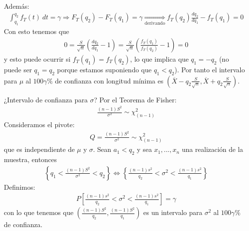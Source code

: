 \begin{ejemplo}
\begin{align*}
    \end{align*}
    Además:
    \begin{align*}
        \int_{q_1}^{q_2}{f_T(t) \ dt} = \gamma \Longrightarrow F_T(q_2) - F_T(q_1) = \gamma \underset{\text{derivando}}{\Longrightarrow} f_T(q_2)\frac{d q_2}{d q_1} - f_T(q_1) = 0
    \end{align*}
    Con esto tenemos que
    \begin{align*}
        0 = \frac{S}{\sqrt{n}}\left( \frac{d q_2}{d q_1} -1 \right) = \frac{S}{\sqrt{n}}\left( \frac{f_T(q_1)}{f_T(q_2)} -1 \right) = 0
    \end{align*}
    y esto puede ocurrir si $f_T(q_1) = f_T(q_2)$, lo que implica que $q_1 = -q_2$ (no puede ser $q_1 = q_2$ porque estamos suponiendo que $q_1 < q_2$). Por tanto el intervalo para $\mu$ al $100 \gamma \%$ de confianza con longitud mínima es $\left(\overline{X} - q_2 \frac{S}{\sqrt{n}} , \overline{X} +q_2\frac{S}{\sqrt{n}}\right)$.

    ¿Intervalo de confianza para $\sigma$? Por el Teorema de Fisher:
    \begin{align*}
        \frac{(n-1)S^2}{\sigma^2} \sim \chi^2_{(n-1)}
    \end{align*}
    Consideramos el pivote:
    \begin{align*}
        Q = \frac{(n-1)S^2}{\sigma^2} \sim \chi^2_{(n-1)}
    \end{align*}
    que es independiente de $\mu$ y $\sigma$. Sean $a_1 < q_2$ y sea $x_1,...,x_n$ una realización de la muestra, entonces
    \begin{align*}
        \left\{ q_1 < \frac{(n-1)S^2}{\sigma^2} < q_2\right\} \Longleftrightarrow \left\{ \frac{(n-1)s^2}{q_2} < \sigma^2 < \frac{(n-1)s^2}{q_1} \right\}
    \end{align*}
    Definimos:
    \begin{align*}
        P\left[ \frac{(n-1)s^2}{q_2} < \sigma^2 < \frac{(n-1)s^2}{q_1} \right] = \gamma
    \end{align*}
    con lo que tenemos que $\left(\frac{(n-1)S^2}{q_2}, \frac{(n-1)S^2}{q_1}\right)$ es un intervalo para $\sigma^2$ al $100\gamma \%$ de confianza.
\end{ejemplo}

